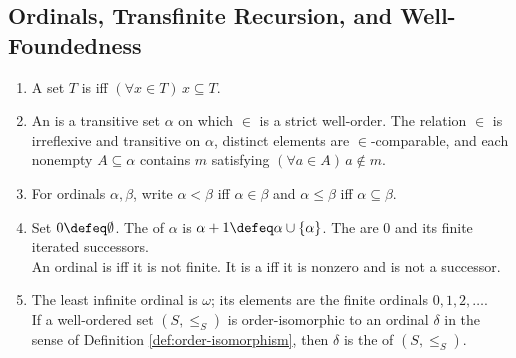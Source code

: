 \subsection{Ordinals, Transfinite Recursion, and Well-Foundedness}

\begin{definition} \label{def:ordinals-and-order-types} 
\begin{enumerate}[label=(\roman*)]
\setlength{\itemsep}{0pt}
\item A set $T$ is  iff $(\forall x\in T)\,x\subseteq T$.
\item An  is a transitive set $\alpha$ on which $\in$ is a strict well-order. The relation $\in$ is irreflexive and transitive on $\alpha$, distinct elements are $\in$-comparable, and each nonempty $A\subseteq\alpha$ contains $m$ satisfying $(\forall a\in A)\,a\notin m$.
\item For ordinals $\alpha,\beta$, write $\alpha<\beta$ iff $\alpha\in\beta$ and $\alpha\leq\beta$ iff $\alpha\subseteq\beta$.
\item Set $0\defeq\emptyset$. The  of $\alpha$ is $\alpha+1\defeq\alpha\cup\{\alpha\}$. The  are $0$ and its finite iterated successors.\\
An ordinal is  iff it is not finite. It is a  iff it is nonzero and is not a successor.
\item The least infinite ordinal is $\omega$; its elements are the finite ordinals $0,1,2,\ldots$.\\
If a well-ordered set $(S,\leq_S)$ is order-isomorphic to an ordinal $\delta$ in the sense of Definition \ref{def:order-isomorphism}, then $\delta$ is the  of $(S,\leq_S)$.
\end{enumerate}
\end{definition}

